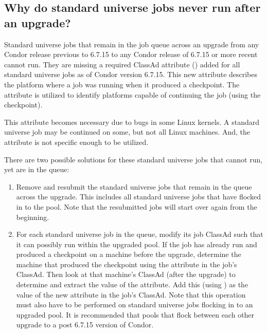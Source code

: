 \subsection*{Why do standard universe jobs never run after an upgrade?}
\label{sec:checkpoint-platform-faq}

Standard universe jobs that remain in the job queue across an upgrade
from any Condor release previous to 6.7.15
to any Condor release of 6.7.15 or more recent
cannot run.
They are missing a required ClassAd attribute
() added for
all standard universe jobs as of Condor version 6.7.15.
This new attribute describes the platform where a job was
running when it produced a checkpoint.
The attribute is utilized to identify platforms capable of 
continuing the job (using the checkpoint).

This attribute becomes necessary due to bugs in some Linux kernels.
A standard universe job may be continued on some, but not all
Linux machines.
And, the  attribute is not specific enough
to be utilized.

There are two possible solutions for these standard universe jobs that
cannot run, yet are in the queue:

\begin{enumerate}
  \item Remove and resubmit the standard universe jobs that
  remain in the queue across the upgrade. 
  This includes all standard universe jobs that have flocked in to 
  the pool.
  Note that the resubmitted jobs will start over again from the beginning.

  \item For each standard universe job in the queue,
  modify its job ClassAd such that it can possibly run within the
  upgraded pool.
  If the job has already run and produced a checkpoint on a machine
  before the upgrade, determine the machine that produced the checkpoint
  using the  attribute
  in the job's ClassAd.
  Then look at that machine's ClassAd (after the upgrade) to
  determine and extract the value of the  attribute.
  Add this (using ) as the value of the 
  new attribute  in the job's ClassAd.
  Note that this operation must also have to be performed on standard
  universe jobs flocking in to an upgraded pool. 
  It is recommended that pools that flock between each other upgrade to a
  post 6.7.15 version of Condor.
\end{enumerate}

